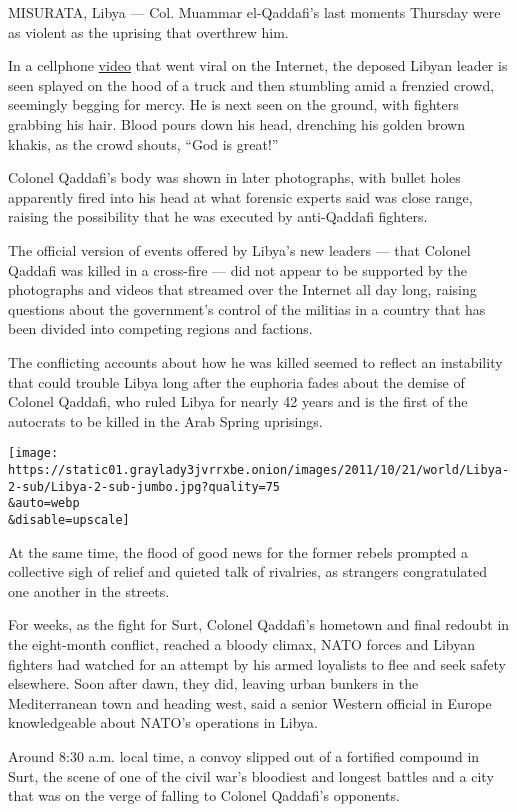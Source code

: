 MISURATA, Libya --- Col. Muammar el-Qaddafi's last moments Thursday were
as violent as the uprising that overthrew him.

In a cellphone
\href{https://www.facebookcorewwwi.onion/photo.php?v=10150362178348094}{video}
that went viral on the Internet, the deposed Libyan leader is seen
splayed on the hood of a truck and then stumbling amid a frenzied crowd,
seemingly begging for mercy. He is next seen on the ground, with
fighters grabbing his hair. Blood pours down his head, drenching his
golden brown khakis, as the crowd shouts, ``God is great!''

Colonel Qaddafi's body was shown in later photographs, with bullet holes
apparently fired into his head at what forensic experts said was close
range, raising the possibility that he was executed by anti-Qaddafi
fighters.

The official version of events offered by Libya's new leaders --- that
Colonel Qaddafi was killed in a cross-fire --- did not appear to be
supported by the photographs and videos that streamed over the Internet
all day long, raising questions about the government's control of the
militias in a country that has been divided into competing regions and
factions.

The conflicting accounts about how he was killed seemed to reflect an
instability that could trouble Libya long after the euphoria fades about
the demise of Colonel Qaddafi, who ruled Libya for nearly 42 years and
is the first of the autocrats to be killed in the Arab Spring uprisings.

\texttt{[image: https://static01.graylady3jvrrxbe.onion/images/2011/10/21/world/Libya-2-sub/Libya-2-sub-jumbo.jpg?quality=75\\\&auto=webp\\\&disable=upscale]}

At the same time, the flood of good news for the former rebels prompted
a collective sigh of relief and quieted talk of rivalries, as strangers
congratulated one another in the streets.

For weeks, as the fight for Surt, Colonel Qaddafi's hometown and final
redoubt in the eight-month conflict, reached a bloody climax, NATO
forces and Libyan fighters had watched for an attempt by his armed
loyalists to flee and seek safety elsewhere. Soon after dawn, they did,
leaving urban bunkers in the Mediterranean town and heading west, said a
senior Western official in Europe knowledgeable about NATO's operations
in Libya.

Around 8:30 a.m. local time, a convoy slipped out of a fortified
compound in Surt, the scene of one of the civil war's bloodiest and
longest battles and a city that was on the verge of falling to Colonel
Qaddafi's opponents.

